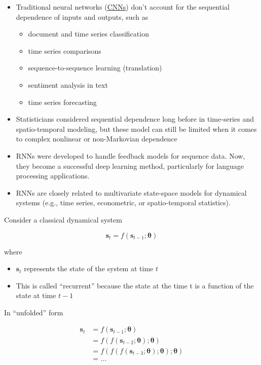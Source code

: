 \documentclass[
]{book}
\begin{document}
\begin{itemize}
\item
  Traditional neural networks (\protect\hyperlink{convolutional-neural-networks}{CNNs}) don't account for the sequential dependence of inputs and outputs, such as

  \begin{itemize}
  \item
    document and time series classification
  \item
    time series comparisons
  \item
    sequence-to-sequence learning (translation)
  \item
    sentiment analysis in text
  \item
    time series forecasting
  \end{itemize}
\item
  Statisticians considered sequential dependence long before in time-series and spatio-temporal modeling, but these model can still be limited when it comes to complex nonlinear or non-Markovian dependence
\item
  RNNs were developed to handle feedback models for sequence data. Now, they become a successful deep learning method, particularly for language processing applications.
\item
  RNNs are closely related to multivariate state-space models for dynamical systems (e.g., time series, econometric, or spatio-temporal statistics).
\end{itemize}

Consider a classical dynamical system

\[
\mathbf{s}_t = f(\mathbf{s}_{t-1} ; \mathbf{\theta})
\]

where

\begin{itemize}
\item
  \(\mathbf{s}_t\) represents the state of the system at time \(t\)
\item
  This is called ``recurrent'' because the state at the time t is a function of the state at time \(t-1\)
\end{itemize}

In ``unfolded'' form

\[
\begin{aligned}
\mathbf{s}_t &= f(\mathbf{s}_{t-1}; \mathbf{\theta}) \\
&= f(f(\mathbf{s}_{t-2}; \mathbf{\theta}); \mathbf{\theta}) \\
&= f(f(f(\mathbf{s}_{t-3}; \mathbf{\theta}); \mathbf{\theta}); \mathbf{\theta}) \\
&= \dots
\end{aligned}
\]
\end{document}
